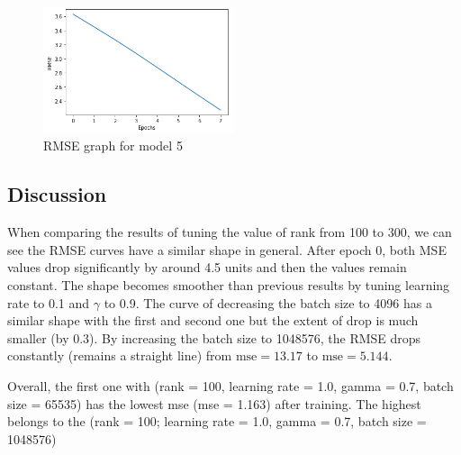 \documentclass[final]{cvpr}
\begin{document}
\begin{figure}
	\includegraphics[width=0.5\textwidth]{screenshot20210415234604.png}
	\caption{RMSE graph for model 5}
\end{figure}

\hspace{10em}

\subsection{Discussion}
When comparing the results of tuning the value of rank from 100 to 300, we can see the RMSE curves have a similar shape in general. After epoch 0, both MSE values drop significantly by around 4.5 units and then the values remain constant. The shape becomes smoother than previous results by tuning learning rate to 0.1 and $\gamma$ to 0.9. The curve of decreasing the batch size to 4096 has a similar shape with the first and second one but the extent of drop is much smaller (by 0.3). By increasing the batch size to 1048576, the RMSE drops constantly (remains a straight line) from $\text{mse} = 13.17$ to $\text{mse} = 5.144$.

Overall, the first one with (rank = 100, learning rate = 1.0, gamma = 0.7, batch size = 65535) has the lowest mse (mse = 1.163) after training. The highest belongs to the (rank = 100; learning rate = 1.0, gamma = 0.7, batch size = 1048576)

{\small
	
	
}
\end{document}
